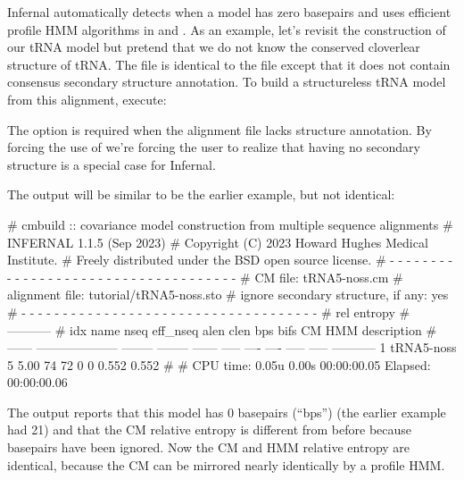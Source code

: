 Infernal automatically detects when a model has zero basepairs and
uses efficient profile HMM algorithms in  and
. As an example, let's revisit the construction of our
tRNA model but pretend that we do not know the conserved cloverlear
structure of tRNA. The file 
 is identical to the file 
 except that it does not contain consensus
secondary structure annotation. 
To build a structureless tRNA model from this alignment, execute:


The  option is required when the alignment file lacks
structure annotation. By forcing the use of  we're
forcing the user to realize that having no secondary structure is a
special case for Infernal.

The output will be similar to be the earlier example, but not
identical:

\begin{sreoutput}
# cmbuild :: covariance model construction from multiple sequence alignments
# INFERNAL 1.1.5 (Sep 2023)
# Copyright (C) 2023 Howard Hughes Medical Institute.
# Freely distributed under the BSD open source license.
# - - - - - - - - - - - - - - - - - - - - - - - - - - - - - - - - - - - -
# CM file:                                            tRNA5-noss.cm
# alignment file:                                     tutorial/tRNA5-noss.sto
# ignore secondary structure, if any:                 yes
# - - - - - - - - - - - - - - - - - - - - - - - - - - - - - - - - - - - -
#                                                                      rel entropy
#                                                                      -----------
# idx    name                     nseq eff_nseq   alen  clen  bps bifs    CM   HMM description
# ------ -------------------- -------- -------- ------ ----- ---- ---- ----- ----- -----------
       1 tRNA5-noss                  5     5.00     74    72    0    0 0.552 0.552 
#
# CPU time: 0.05u 0.00s 00:00:00.05 Elapsed: 00:00:00.06
\end{sreoutput}

The output reports that this model has 0 basepairs (``bps'') (the
earlier example had 21) and that the CM relative entropy is different
from before because basepairs have been ignored. Now the CM and HMM 
relative entropy are identical, because the CM can be mirrored nearly
identically by a profile HMM.

